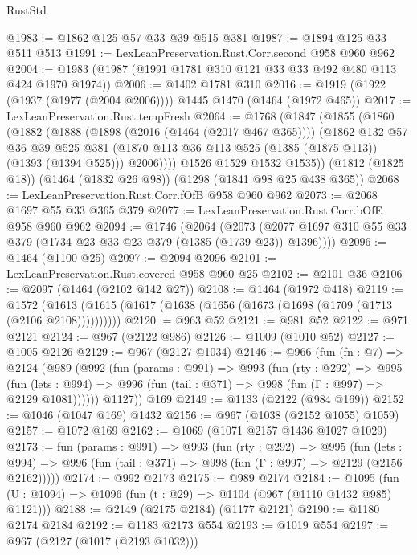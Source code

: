 \begin{lexlean}{RustStd}
\begin{coremodule}
@1983 := @1862 @125 @57 @33 @39 @515 @381
@1987 := @1894 @125 @33 @511 @513
@1991 := LexLeanPreservation.Rust.Corr.second @958 @960 @962
@2004 := @1983 (@1987 (@1991 @1781 @310 @121 @33 @33 @492 @480 @113 @424 @1970 @1974))
@2006 := @1402 @1781 @310
@2016 := @1919 (@1922 (@1937 (@1977 (@2004 @2006)))) @1445 @1470 (@1464 (@1972 @465))
@2017 := LexLeanPreservation.Rust.tempFresh
@2064 := @1768
    (@1847
      (@1855
        (@1860
          (@1882
            (@1888
              (@1898 (@2016 (@1464 (@2017 @467 @365))))
              (@1862
                @132
                @57
                @36
                @39
                @525
                @381
                (@1870 @113 @36 @113 @525 (@1385 (@1875 @113)) (@1393 (@1394 @525)))
                @2006))))
        @1526
        @1529
        @1532
        @1535))
    (@1812 (@1825 @18))
    (@1464 (@1832 @26 @98))
    (@1298 (@1841 @98 @25 @438 @365))
@2068 := LexLeanPreservation.Rust.Corr.fOfB @958 @960 @962
@2073 := @2068 @1697 @55 @33 @365 @379
@2077 := LexLeanPreservation.Rust.Corr.bOfE @958 @960 @962
@2094 := @1746
    (@2064
      (@2073 (@2077 @1697 @310 @55 @33 @379 (@1734 @23 @33 @23 @379 (@1385 (@1739 @23)) @1396))))
@2096 := @1464 (@1100 @25)
@2097 := @2094 @2096
@2101 := LexLeanPreservation.Rust.covered @958 @960 @25
@2102 := @2101 @36
@2106 := @2097 (@1464 (@2102 @142 @27))
@2108 := @1464 (@1972 @418)
@2119 := @1572 (@1613 (@1615 (@1617 (@1638 (@1656 (@1673 (@1698 (@1709 (@1713 (@2106 @2108))))))))))
@2120 := @963 @52
@2121 := @981 @52
@2122 := @971 @2121
@2124 := @967 (@2122 @986)
@2126 := @1009 (@1010 @52)
@2127 := @1005 @2126
@2129 := @967 (@2127 @1034)
@2146 := @966
    (fun (fn : @7) =>
    @2124
      (@989
        (@992
          (fun (params : @991) =>
          @993
            (fun (rty : @292) =>
            @995
              (fun (lets : @994) =>
              @996 (fun (tail : @371) => @998 (fun (Γ : @997) => @2129 @1081))))))
        @1127))
    @169
@2149 := @1133 (@2122 (@984 @169))
@2152 := @1046 (@1047 @169) @1432
@2156 := @967 (@1038 (@2152 @1055) @1059)
@2157 := @1072 @169
@2162 := @1069 (@1071 @2157 @1436 @1027 @1029)
@2173 := fun (params : @991) =>
  @993
    (fun (rty : @292) =>
    @995
      (fun (lets : @994) =>
      @996 (fun (tail : @371) => @998 (fun (Γ : @997) => @2129 (@2156 @2162)))))
@2174 := @992 @2173
@2175 := @989 @2174
@2184 := @1095 (fun (U : @1094) => @1096 (fun (t : @29) => @1104 (@967 (@1110 @1432 @985) @1121)))
@2188 := @2149 (@2175 @2184) (@1177 @2121)
@2190 := @1180 @2174 @2184
@2192 := @1183 @2173 @554
@2193 := @1019 @554
@2197 := @967 (@2127 (@1017 (@2193 @1032)))

\end{coremodule}
\end{lexlean}
